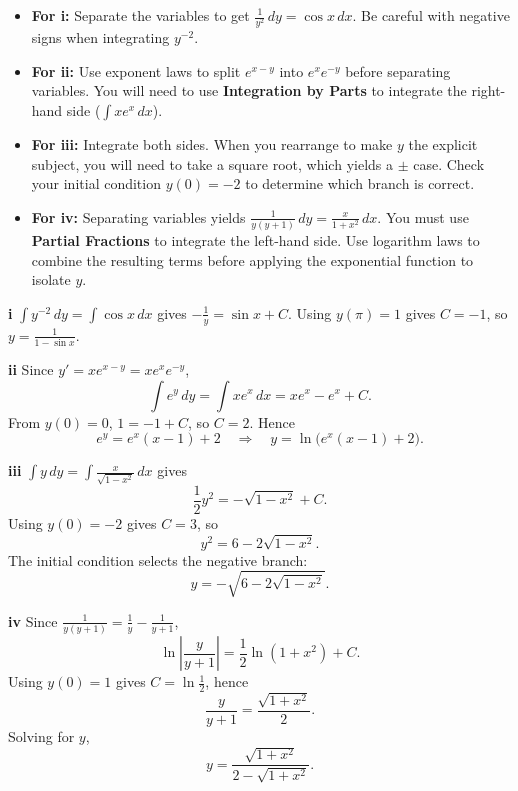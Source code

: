 \begin{hint}
\begin{itemize}
    \item \textbf{For i:} Separate the variables to get $\frac{1}{y^2} \, dy = \cos x \, dx$. Be careful with negative signs when integrating $y^{-2}$.
    \item \textbf{For ii:} Use exponent laws to split $e^{x-y}$ into $e^x e^{-y}$ before separating variables. You will need to use \textbf{Integration by Parts} to integrate the right-hand side ($\int x e^x \, dx$).
    \item \textbf{For iii:} Integrate both sides. When you rearrange to make $y$ the explicit subject, you will need to take a square root, which yields a $\pm$ case. Check your initial condition $y(0) = -2$ to determine which branch is correct.
    \item \textbf{For iv:} Separating variables yields $\frac{1}{y(y+1)} \, dy = \frac{x}{1+x^2} \, dx$. You must use \textbf{Partial Fractions} to integrate the left-hand side. Use logarithm laws to combine the resulting terms before applying the exponential function to isolate $y$.
\end{itemize}
\end{hint}

\begin{solution}
\textbf{i} $\int y^{-2}\,dy=\int\cos x\,dx$ gives $-\frac1y=\sin x+C$.  
Using $y(\pi)=1$ gives $C=-1$, so $\boxed{y=\frac{1}{1-\sin x}}$.

\textbf{ii} Since $y'=xe^{x-y}=xe^xe^{-y}$,
\[
\int e^y\,dy=\int xe^x\,dx=x e^x-e^x+C.
\]
From $y(0)=0$, $1=-1+C$, so $C=2$. Hence
\[
e^y=e^x(x-1)+2
\quad\Rightarrow\quad
\boxed{y=\ln\!\bigl(e^x(x-1)+2\bigr)}.
\]

\textbf{iii} $\int y\,dy=\int \frac{x}{\sqrt{1-x^2}}\,dx$ gives
\[
\frac12y^2=-\sqrt{1-x^2}+C.
\]
Using $y(0)=-2$ gives $C=3$, so
\[
y^2=6-2\sqrt{1-x^2}.
\]
The initial condition selects the negative branch:
\[
\boxed{y=-\sqrt{6-2\sqrt{1-x^2}}}.
\]

\textbf{iv} Since $\frac1{y(y+1)}=\frac1y-\frac1{y+1}$,
\[
\ln\left|\frac{y}{y+1}\right|=\frac12\ln(1+x^2)+C.
\]
Using $y(0)=1$ gives $C=\ln\frac12$, hence
\[
\frac{y}{y+1}=\frac{\sqrt{1+x^2}}{2}.
\]
Solving for $y$,
\[
\boxed{y=\frac{\sqrt{1+x^2}}{2-\sqrt{1+x^2}}}.
\]
\end{solution}

